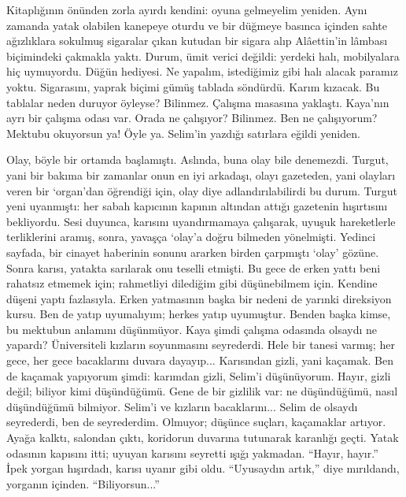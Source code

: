 \documentclass[a5paper,12pt]{scrbook}
\begin{document}
Kitaplığının önünden zorla ayırdı kendini: oyuna gelmeyelim yeniden. Aynı
zamanda yatak olabilen kanepeye oturdu ve bir düğmeye basınca içinden sahte
ağızlıklara sokulmuş sigaralar çıkan kutudan bir sigara alıp Alâettin'in lâmbası
biçimindeki çakmakla yaktı. Durum, ümit verici değildi: yerdeki halı,
mobilyalara hiç uymuyordu. Düğün hediyesi. Ne yapalım, istediğimiz gibi halı
alacak paramız yoktu. Sigarasını, yaprak biçimi gümüş tablada söndürdü. Karım
kızacak. Bu tablalar neden duruyor öyleyse? Bilinmez. Çalışma masasına yaklaştı.
Kaya'nın ayrı bir çalışma odası var. Orada ne çalışıyor? Bilinmez. Ben ne
çalışıyorum? Mektubu okuyorsun ya! Öyle ya. Selim'in yazdığı satırlara eğildi
yeniden.

Olay, böyle bir ortamda başlamıştı. Aslında, buna olay bile denemezdi. Turgut,
yani bir bakıma bir zamanlar onun en iyi arkadaşı, olayı gazeteden, yani
olayları veren bir `organ'dan öğrendiği için, olay diye adlandırılabilirdi bu
durum. Turgut yeni uyanmıştı: her sabah kapıcının kapının altından attığı
gazetenin hışırtısını bekliyordu. Sesi duyunca, karısını uyandırmamaya
çalışarak, uyuşuk hareketlerle terliklerini aramış, sonra, yavaşça `olay'a doğru
bilmeden yönelmişti. Yedinci sayfada, bir cinayet haberinin sonunu ararken
birden çarpmıştı `olay' gözüne. Sonra karısı, yatakta sarılarak onu teselli
etmişti. Bu gece de erken yattı beni rahatsız etmemek için; rahmetliyi dilediğim
gibi düşünebilmem için. Kendine düşeni yaptı fazlasıyla. Erken yatmasının başka
bir nedeni de yarınki direksiyon kursu. Ben de yatıp uyumalıyım; herkes yatıp
uyumuştur. Benden başka kimse, bu mektubun anlamını düşünmüyor. Kaya şimdi
çalışma odasında olsaydı ne yapardı? Üniversiteli kızların soyunmasını
seyrederdi. Hele bir tanesi varmış; her gece, her gece bacaklarını duvara
dayayıp... Karısından gizli, yani kaçamak. Ben de kaçamak yapıyorum şimdi:
karımdan gizli, Selim'i düşünüyorum. Hayır, gizli değil; biliyor kimi
düşündüğümü. Gene de bir gizlilik var: ne düşündüğümü, nasıl düşündüğümü
bilmiyor. Selim'i ve kızların bacaklarını... Selim de olsaydı seyrederdi, ben de
seyrederdim. Olmuyor; düşünce suçları, kaçamaklar artıyor. Ayağa kalktı,
salondan çıktı, koridorun duvarına tutunarak karanlığı geçti. Yatak odasının
kapısını itti; uyuyan karısını seyretti ışığı yakmadan. ``Hayır, hayır.'' İpek
yorgan hışırdadı, karısı uyanır gibi oldu. ``Uyusaydın artık,'' diye mırıldandı,
yorganın içinden. ``Biliyorsun...''
\end{document}

